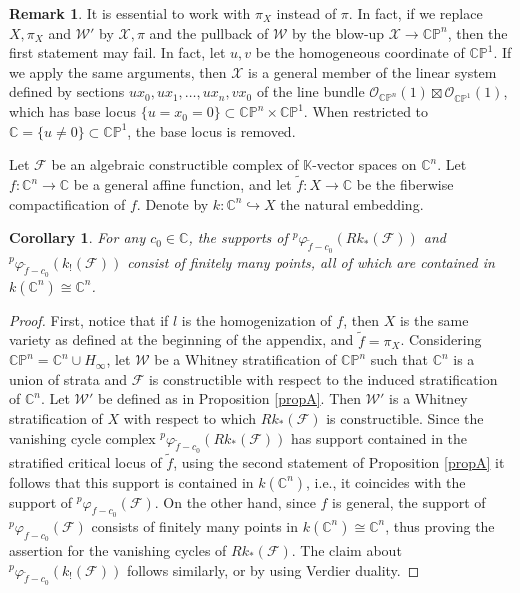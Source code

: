 \documentclass[12pt,leqno,twoside]{amsart}
\theoremstyle{plain}
\newtheorem{cor}[theorem]{Corollary}
\theoremstyle{definition}
\newtheorem{rmk}[theorem]{Remark}
\newcommand{\CP}{\mathbb{CP}}
\newcommand{\C}{\mathbb{C}}
\newcommand{\K}{\mathbb{K}}
\newcommand{\cX}{\mathcal{X}}
\newcommand{\sF}{\mathcal{F}}
\begin{document}
\begin{rmk}
It is essential to work with $\pi_X$ instead of $\pi$. In fact, if we replace $X, \pi_X$ and $\mathcal{W}'$ by $\cX, \pi$ and the pullback of $\mathcal{W}$ by the blow-up $\cX\to \CP^n$, then the first statement may fail. In fact, let $u, v$ be the homogeneous coordinate of $\CP^1$. If we apply the same arguments, then $\cX$ is a general member of the linear system defined by sections $ux_0, ux_1, \dots, ux_n, vx_0$ of the line bundle $\mathcal{O}_{\CP^n}(1)\boxtimes \mathcal{O}_{\CP^1}(1)$, which has base locus $\{u=x_0=0\}\subset \CP^n\times \CP^1$. When restricted to $\C=\{u\neq 0\}\subset \CP^1$, the base locus is removed. 
\end{rmk}



Let $\sF$ be an algebraic constructible complex of $\K$-vector spaces on $\C^n$. Let $f\colon \C^n\to \C$ be a general affine  function, and let $\widetilde{f}\colon X\to \C$ be the 
fiberwise compactification of $f$. Denote by $k:\C^n \hookrightarrow X$ the natural embedding.
\begin{cor}\label{cor33}
For any $c_0\in \C$, the supports of ${^p\varphi}_{\widetilde{f}-c_0}(Rk_*(\sF))$ and ${^p\varphi}_{\widetilde{f}-c_0}(k_!(\sF))$ consist of finitely many points, all of which are contained in $k(\C^n)\cong \C^n$. 
\end{cor}
\begin{proof}
First, notice that if $l$ is the homogenization of $f$, then $X$ is the same variety as defined at the beginning of the appendix, and $\widetilde{f}=\pi_X$. 
Considering $\CP^n=\C^n\cup H_\infty$, let $\mathcal{W}$ be a Whitney stratification of $\CP^n$ such that $\C^n$ is a union of strata and $\sF$ is constructible with respect to the induced stratification of $\C^n$. Let $\mathcal{W}'$ be defined as in Proposition \ref{propA}. Then $\mathcal{W}'$ is a Whitney stratification of $X$ with respect to which $Rk_*(\sF)$ is constructible. Since the vanishing cycle complex ${^p\varphi}_{\widetilde{f}-c_0}(Rk_*(\sF))$ has support contained in the stratified critical locus of $\widetilde{f}$, using the second statement of Proposition \ref{propA} it follows that this support is contained in $k(\C^n)$, i.e., it coincides with the support of ${^p}\varphi_{f-c_0}(\sF)$. On the other hand, since $f$ is general,  the support of ${^p}\varphi_{f-c_0}(\sF)$ consists of finitely many points in $k(\C^n)\cong \C^n$, thus proving the assertion for the vanishing cycles of $Rk_*(\sF)$. 
The claim about ${^p\varphi}_{\widetilde{f}-c_0}(k_!(\sF))$ follows similarly, or by using Verdier duality.
\end{proof}
\end{document}
